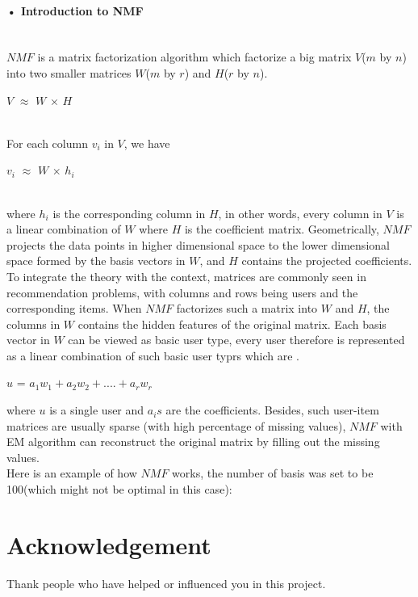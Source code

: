 \documentclass{article}
\begin{document}
\paragraph{• Introduction to NMF}\mbox{}\\
$NMF$ is a matrix factorization algorithm which factorize a big matrix $V$($m$ by $n$) into two smaller matrices $W$($m$ by $r$) and $H$($r$ by $n$). \\
\centerline{$V$ $\approx$ $W$ $\times$ $H$}\\
For each column $v_{i}$ in $V$, we have\\
\centerline{$v_{i}$ $\approx$ $W$ $\times$ $h_{i}$}\\
where $h_{i}$ is the corresponding column in $H$, in other words, every column in $V$ is a linear combination of $W$ where $H$ is the coefficient matrix. Geometrically, $NMF$ projects the data points in higher dimensional space to the lower dimensional space formed by the basis vectors in $W$, and $H$ contains the projected coefficients.\\
To integrate the theory with the context, matrices are commonly seen in recommendation problems, with columns and rows being users and the corresponding items. When $NMF$ factorizes such a matrix into $W$ and $H$, the columns in $W$ contains the hidden features of the original matrix. Each basis vector in $W$ can be viewed as basic user type, every user therefore is represented as a linear combination of such basic user typrs which are .\\
\centerline{$u$ = $a_1w_1+a_2w_2+....+a_rw_r$}
where $u$ is a single user and $a_is$ are the coefficients.
Besides, such user-item matrices are usually sparse (with high percentage of missing values), $NMF$ with EM algorithm can reconstruct the original matrix by filling out the missing values.\\
Here is an example of how $NMF$ works, the number of basis was set to be 100(which might not be optimal in this case):


\section*{Acknowledgement}
Thank people who have helped or influenced you in this project.

\nocite{*}



\end{document}
